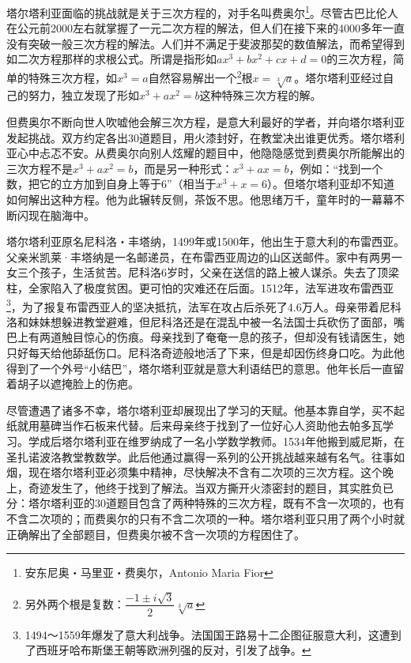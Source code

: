 \documentclass[b5paper]{ctexart}
\begin{document}
塔尔塔利亚面临的挑战就是关于三次方程的，对手名叫费奥尔\footnote{安东尼奥・马里亚・费奥尔，Antonio Maria Fior}。尽管古巴比伦人在公元前2000左右就掌握了一元二次方程的解法，但人们在接下来的4000多年一直没有突破一般三次方程的解法。人们并不满足于斐波那契的数值解法，而希望得到如二次方程那样的求根公式。所谓是指形如$ax^3 + bx^2 + cx + d = 0$的三次方程，简单的特殊三次方程，如$x^3 = a$自然容易解出一个\footnote{另外两个根是复数：$\dfrac{-1 \pm i\sqrt{3}}{2}\sqrt[3]{a}$}根$x = \sqrt[3]{a}$。塔尔塔利亚经过自己的努力，独立发现了形如$x^3 + ax^2 = b$这种特殊三次方程的解。

但费奥尔不断向世人吹嘘他会解三次方程，是意大利最好的学者，并向塔尔塔利亚发起挑战。双方约定各出30道题目，用火漆封好，在教堂决出谁更优秀。塔尔塔利亚心中忐忑不安。从费奥尔向别人炫耀的题目中，他隐隐感觉到费奥尔所能解出的三次方程不是$x^3 + ax^2 = b$，而是另一种形式：$x^3 + ax = b$，例如：“找到一个数，把它的立方加到自身上等于6”（相当于$x^3 + x = 6$）。但塔尔塔利亚却不知道如何解出这种方程\cite{MacTour-Tartaglia-Cardan}。他为此辗转反侧，茶饭不思。他思绪万千，童年时的一幕幕不断闪现在脑海中。

塔尔塔利亚原名尼科洛・丰塔纳，1499年或1500年，他出生于意大利的布雷西亚。父亲米凯莱·丰塔纳是一名邮递员，在布雷西亚周边的山区送邮件。家中有两男一女三个孩子，生活贫苦。尼科洛6岁时，父亲在送信的路上被人谋杀。失去了顶梁柱，全家陷入了极度贫困。更可怕的灾难还在后面。1512年，法军进攻布雷西亚\footnote{1494～1559年爆发了意大利战争。法国国王路易十二企图征服意大利，这遭到了西班牙哈布斯堡王朝等欧洲列强的反对，引发了战争。}，为了报复布雷西亚人的坚决抵抗，法军在攻占后杀死了4.6万人。母亲带着尼科洛和妹妹想躲进教堂避难，但尼科洛还是在混乱中被一名法国士兵砍伤了面部，嘴巴上有两道触目惊心的伤痕。母亲找到了奄奄一息的孩子，但却没有钱请医生，她只好每天给他舔舐伤口。尼科洛奇迹般地活了下来，但是却因伤终身口吃。为此他得到了一个外号“小结巴”，塔尔塔利亚就是意大利语结巴的意思。他年长后一直留着胡子以遮掩脸上的伤疤。

尽管遭遇了诸多不幸，塔尔塔利亚却展现出了学习的天赋。他基本靠自学，买不起纸就用墓碑当作石板来代替。后来母亲终于找到了一位好心人资助他去帕多瓦学习。学成后塔尔塔利亚在维罗纳成了一名小学数学教师。1534年他搬到威尼斯，在圣扎诺波洛教堂教数学。此后他通过赢得一系列的公开挑战越来越有名气\cite{MacTour-Tartaglia}。往事如烟，现在塔尔塔利亚必须集中精神，尽快解决不含有二次项的三次方程。这个晚上，奇迹发生了，他终于找到了解法。当双方撕开火漆密封的题目，其实胜负已分：塔尔塔利亚的30道题目包含了两种特殊的三次方程，既有不含一次项的，也有不含二次项的；而费奥尔的只有不含二次项的一种。塔尔塔利亚只用了两个小时就正确解出了全部题目，但费奥尔被不含一次项的方程困住了。
\end{document}
